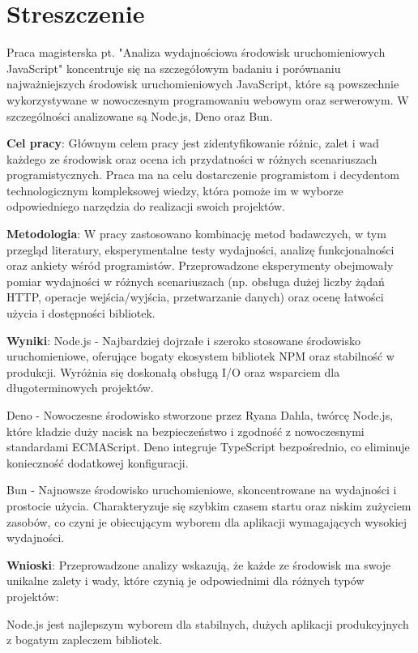 \section*{Streszczenie}
Praca magisterska pt. "Analiza wydajnościowa środowisk uruchomieniowych JavaScript" koncentruje się na szczegółowym badaniu i porównaniu najważniejszych środowisk uruchomieniowych JavaScript, które są powszechnie wykorzystywane w nowoczesnym programowaniu webowym oraz serwerowym. W szczególności analizowane są Node.js, Deno oraz Bun.

\textbf{Cel pracy}: Głównym celem pracy jest zidentyfikowanie różnic, zalet i wad każdego ze środowisk oraz ocena ich przydatności w różnych scenariuszach programistycznych. Praca ma na celu dostarczenie programistom i decydentom technologicznym kompleksowej wiedzy, która pomoże im w wyborze odpowiedniego narzędzia do realizacji swoich projektów.

\textbf{Metodologia}: W pracy zastosowano kombinację metod badawczych, w tym przegląd literatury, eksperymentalne testy wydajności, analizę funkcjonalności oraz ankiety wśród programistów. Przeprowadzone eksperymenty obejmowały pomiar wydajności w różnych scenariuszach (np. obsługa dużej liczby żądań HTTP, operacje wejścia/wyjścia, przetwarzanie danych) oraz ocenę łatwości użycia i dostępności bibliotek.

\textbf{Wyniki}:
Node.js - Najbardziej dojrzałe i szeroko stosowane środowisko uruchomieniowe, oferujące bogaty ekosystem bibliotek NPM oraz stabilność w produkcji. Wyróżnia się doskonałą obsługą I/O oraz wsparciem dla długoterminowych projektów.

Deno - Nowoczesne środowisko stworzone przez Ryana Dahla, twórcę Node.js, które kładzie duży nacisk na bezpieczeństwo i zgodność z nowoczesnymi standardami ECMAScript. Deno integruje TypeScript bezpośrednio, co eliminuje konieczność dodatkowej konfiguracji.

Bun - Najnowsze środowisko uruchomieniowe, skoncentrowane na wydajności i prostocie użycia. Charakteryzuje się szybkim czasem startu oraz niskim zużyciem zasobów, co czyni je obiecującym wyborem dla aplikacji wymagających wysokiej wydajności.

\textbf{Wnioski}:
Przeprowadzone analizy wskazują, że każde ze środowisk ma swoje unikalne zalety i wady, które czynią je odpowiednimi dla różnych typów projektów:

Node.js jest najlepszym wyborem dla stabilnych, dużych aplikacji produkcyjnych z bogatym zapleczem bibliotek.

